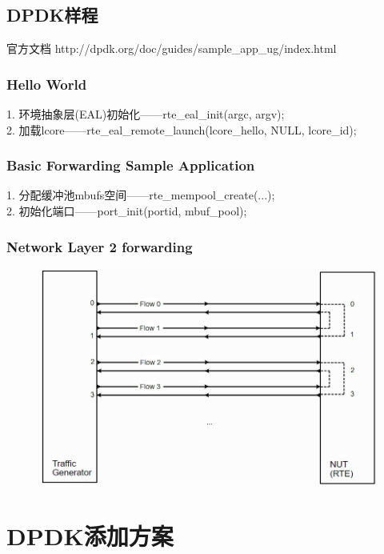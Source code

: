 \documentclass{article}
\begin{document}
\subsection{DPDK样程}
官方文档 http://dpdk.org/doc/guides/sample\_app\_ug/index.html \\
\subsubsection{Hello World}
1. 环境抽象层(EAL)初始化——rte\_eal\_init(argc, argv);\\
2. 加载lcore——rte\_eal\_remote\_launch(lcore\_hello, NULL, lcore\_id);\\
\subsubsection{Basic Forwarding Sample Application}
1. 分配缓冲池mbufs空间——rte\_mempool\_create(...);\\
2. 初始化端口——port\_init(portid, mbuf\_pool);\\
\subsubsection{Network Layer 2 forwarding}
\begin{figure}[H]
	\centering
	\includegraphics[width = \textwidth]{frame_l2f.jpg}
\end{figure}

\section{DPDK添加方案}
\end{document}
